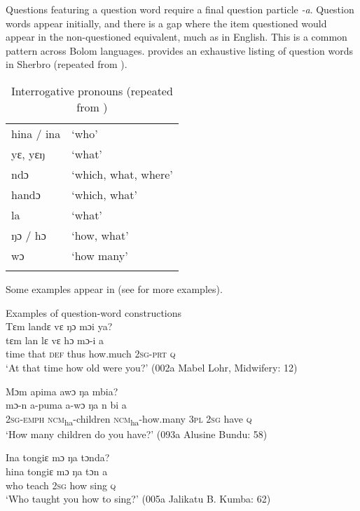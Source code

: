 Questions featuring a question word require a final question particle \textit{{}-a}. Question words appear initially, and there is a gap where the item questioned would appear in the non-questioned equivalent, much as in English. This is a common pattern across Bolom languages.  provides an exhaustive listing of question words in Sherbro (repeated from ).

\begin{table}
\caption{\label{tab:syn:43}Interrogative pronouns (repeated from )}

\begin{tabular}{ll}
\lsptoprule
hina / ina & ‘who'\\
yɛ, yɛŋ & ‘what'\\
ndɔ & ‘which, what, where'\\
handɔ & ‘which, what'\\
la & ‘what'\\
ŋɔ / hɔ & ‘how, what'\\
wɔ & ‘how many'\\
\lspbottomrule
\end{tabular}
\end{table}

Some examples appear in  (see  for more examples).

\ea%
    \label{ex:221}
    Examples of question-word constructions\\
    \ea Tɛm landɛ vɛ ŋɔ mɔi  ya?\\
    \gll tɛm  lan    lɛ    vɛ    hɔ          mɔ-i      a\\
    time  that    \textsc{def}  thus  how.much    \textsc{2sg-prt}    \textsc{q}\\
    \glt ‘At that time how old were you?' (002a Mabel Lohr, Midwifery: 12)

    \ex Mɔm apima awɔ ŋa mbia?\\
    \gll mɔ-n      a-puma        a-wɔ            ŋa    n    bi    a\\
    \textsc{2sg-emph}  \textsc{ncm}\textsubscript{ha}{}-children  \textsc{ncm}\textsubscript{ha}{}-how.many    \textsc{3pl}  \textsc{2sg}  have  \textsc{q}\\
    \glt ‘‎How many children do you have?' (093a Alusine Bundu: 58)

    \ex Ina tongiɛ mɔ ŋa tɔnda?\\
    \gll hina  tongiɛ  mɔ  ŋa    tɔn  a\\
    who  teach    \textsc{2sg}  how  sing  \textsc{q}\\
    \glt ‘Who taught you how to sing?' (005a Jalikatu B. Kumba: 62)
\z
\z


